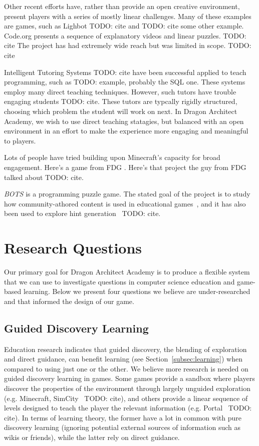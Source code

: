 \documentclass{sig-alternate}
\newcommand{\TODO}[1]{{\color{red} TODO: #1}}
\newcommand{\gametitle}{{\color{RoyalPurple} Dragon Architect Academy}}
\begin{document}
Other recent efforts have, rather than provide an open creative environment, present players with a series of mostly linear challenges.
Many of these examples are games, such as Lighbot \TODO{cite} and \TODO{cite some other example}.
Code.org presents a sequence of explanatory videos and linear puzzles. \TODO{cite}
The project has had extremely wide reach but was limited in scope. \TODO{cite}

Intelligent Tutoring Systems \TODO{cite} have been successful applied to teach programming, such as \TODO{example, probably the SQL one}.
These systems employ many direct teaching techniques.
However, such tutors have trouble engaging students \TODO{cite}.
These tutors are typcally rigidly structured, choosing which problem the student will work on next.
In \gametitle{}, we wish to use direct teaching statagies, but balanced with an open environment in an effort to make the experience more engaging and meaningful to players.

Lots of people have tried building upon Minecraft's capacity for broad engagement.
Here's a game from FDG \cite{zorn2013minecraft}.
Here's that project the guy from FDG talked about \TODO{cite}.

\emph{BOTS} is a programming puzzle game. The stated goal of the project is to study how community-athored content is used in educational games~\cite{hickspart14}, and it has also been used to explore hint generation~\TODO{cite}.


\section{Research Questions}
\label{sec:research}
Our primary goal for \gametitle{} is to produce a flexible system that we can use to investigate questions in computer science education and game-based learning. 
Below we present four questions we believe are under-researched and that informed the design of our game. 

\subsection{Guided Discovery Learning}
Education research indicates that guided discovery, the blending of exploration and direct guidance, can benefit learning (see Section~\ref{subsec:learning}) when compared to using just one or the other. 
We believe more research is needed on guided discovery learning in games. 
Some games provide a sandbox where players discover the properties of the environment through largely unguided exploration (e.g. Minecraft, SimCity~\TODO{cite}), and others provide a linear sequence of levels designed to teach the player the relevant information (e.g. Portal~\TODO{cite}). 
In terms of learning theory, the former have a lot in common with pure discovery learning (ignoring potential external sources of information such as wikis or friends), while the latter rely on direct guidance. 
\end{document}
